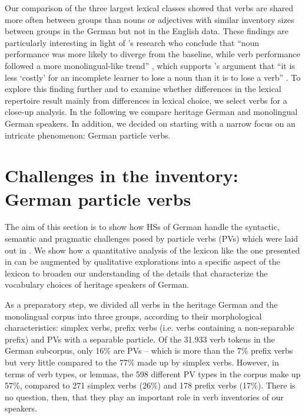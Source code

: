 \documentclass[output=paper,colorlinks,citecolor=brown]{langscibook}
\begin{document}
Our comparison of the three largest lexical classes showed that verbs are shared more often between groups than nouns or adjectives with similar inventory sizes between groups in the German but not in the English data. These findings are particularly interesting in light of \citet{FridmanMeir2023LexProdInnov}'s research who conclude that ``noun performance was more likely to diverge from the baseline, while verb performance followed a more monolingual-like trend'' \citep[890]{FridmanMeir2023LexProdInnov}, which supports \citet{Polinsky2005WordClassIncompGrammar}'s argument that ``it is less ‘costly’ for an incomplete learner to lose a noun than it is to lose a verb'' \citep[430]{Polinsky2005WordClassIncompGrammar}. To explore this finding further and to examine whether differences in the lexical repertoire result mainly from differences in lexical choice, we select verbs for a close-up analysis. In the following we compare heritage German and monolingual German speakers. In addition, we decided on starting with a narrow focus on an intricate phenomenon: German particle verbs.


\section{Challenges in the inventory: German particle verbs} \label{sec:kelleretal:ger-part-verbs}

The aim of this section is to show how HSs of German handle the syntactic, semantic and pragmatic challenges posed by particle verbs (PVs) which were laid out in . We show how a quantitative analysis of the lexicon like the one presented in  can be augmented by qualitative explorations into a specific aspect of the lexicon to broaden our understanding of the details that characterize the vocabulary choices of heritage speakers of German.

As a preparatory step, we divided all verbs in the heritage German and the monolingual corpus into three groups, according to their morphological characteristics: simplex verbs, prefix verbs (i.e. verbs containing a non-separable prefix) and PVs with a separable particle. Of the 31.933 verb tokens in the German subcorpus, only 16\% are PVs – which is more than the 7\% prefix verbs but very little compared to the 77\% made up by simplex verbs. However, in terms of verb types, or lemmas, the 598 different PV types in the corpus make up 57\%, compared to 271 simplex verbs (26\%) and 178 prefix verbs (17\%). There is no question, then, that they play an important role in verb inventories of our speakers.
\end{document}
